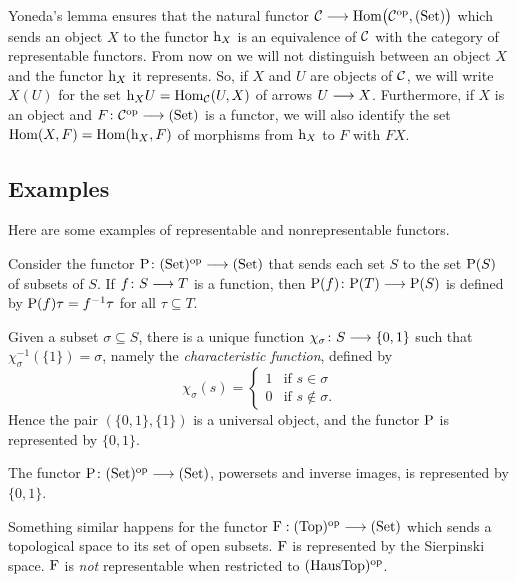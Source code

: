 \begin{2   CONTRAVARIANT FUNCTORS}
\begin{2.1 Yoneda Lemma}
Yoneda's lemma ensures that the natural functor $\cC \arr \func{\cC}$ which sends an object $X$ to the functor $\mathrm{h}_X$ is an equivalence of $\mathcal{C}$ with the category of representable functors. From now on we will not distinguish between an object $X$ and the functor $\mathrm{h}_X$ it represents. So, if $X$ and $U$ are objects of $\mathcal{C}$, we will write $X(U)$ for the set  $\mathrm{h}_X U = \operatorname{Hom}_{\mathcal{C}}(U,X)$ of arrows $U \arr X$. Furthermore, if $X$ is an object and $F \colon \cC\op \arr \catset$ is a functor, we will also identify the set $\operatorname{Hom}(X, F) = \operatorname{Hom}(\mathrm{h}_X, F)$ of morphisms from $\mathrm{h}_X$ to $F$ with $F X$.



\subsection{Examples}\label{subsec:examples}

Here are some examples of representable and non\dash represent\-a\-ble functors.


\begin{enumeratei}

\item Consider the functor $\rP \colon \catset\op \arr \catset$ that sends each set $S$ to the set $\mathrm{P}(S)$ of subsets of $S$. If $f \colon S \arr T$ is a function, then $\rP(f) \colon \rP(T) \arr \rP(S)$ is defined by $\mathrm{P}(f)\tau = f^{-1}\tau$ for all $\tau \subseteq T$.

Given a subset $\sigma \subseteq S$, there is a unique function $\chi_\sigma \colon S \arr \{0,1\}$ such that $\chi_\sigma^{-1}(\{1\}) = \sigma$, namely the \emph{characteristic function}, defined by 
   \[
   \chi_\sigma(s) = \begin{cases}1 & \text{if $s \in \sigma$}\\
   0 & \text{if $s \notin \sigma$.}
   \end{cases}
   \]
Hence the pair $(\{0,1\}, \{1\})$ is a universal object, and the functor $\mathrm{P}$ is represented by $\{0,1\}$.
\begin{shaded}
The functor $\rP \colon \catset\op \arr \catset$, powersets and inverse images, is represented by $\{0,1\}$.

Something similar happens for the functor $\rF:\cat{Top}\op \arr \catset$ which sends a topological space to its set of open subsets. $\mathrm{F}$ is represented by the Sierpinski space. $\mathrm{F}$ is \emph{not} representable when restricted to $(\mathrm{HausTop})^{\mathrm{op}}$.
\end{shaded}




\end{enumeratei}
\end{2.1 Yoneda Lemma}
\end{2   CONTRAVARIANT FUNCTORS}
